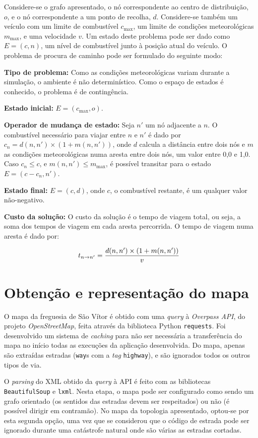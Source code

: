 \documentclass[12pt, a4paper, titlepage]{article}
\begin{document}
Considere-se o grafo apresentado, o nó correspondente ao centro de distribuição, $o$, e o nó
correspondente a um ponto de recolha, $d$. Considere-se também um veículo com um limite de
combustível $c_\text{max}$, um limite de condições meteorológicas $m_\text{max}$, e uma velocidade
$v$. Um estado deste problema pode ser dado como $E = (c, n)$, um nível de combustível junto à
posição atual do veículo. O problema de procura de caminho pode ser formulado do seguinte modo:

\textbf{Tipo de problema:} Como as condições meteorológicas variam durante a simulação, o ambiente é
não determinístico. Como o espaço de estados é conhecido, o problema é de contingência.

\textbf{Estado inicial:} $E = (c_\text{max}, o)$.

\textbf{Operador de mudança de estado:} Seja $n'$ um nó adjacente a $n$. O combustível necessário
para viajar entre $n$ e $n'$ é dado por $c_n = d(n, n') \times (1 + m(n, n'))$, onde $d$ calcula a
distância entre dois nós e $m$ as condições meteorológicas numa aresta entre dois nós, um valor
entre 0,0 e 1,0. Caso $c_n \le c$, e $m(n, n') \le m_\text{max}$, é possível transitar para o estado
$E = (c - c_n, n')$.

\textbf{Estado final:} $E = (c, d)$, onde $c$, o combustível restante, é um qualquer valor
não-negativo.

\textbf{Custo da solução:} O custo da solução é o tempo de viagem total, ou seja, a soma dos tempos
de viagem em cada aresta percorrida. O tempo de viagem numa aresta é dado por:

$$t_{n \rightarrow n'} = {d(n, n') \times (1 + m(n, n')) \over v}$$

\section{Obtenção e representação do mapa}

O mapa da freguesia de São Vítor é obtido com uma \emph{query} à \emph{Overpass API}, do projeto
\emph{OpenStreetMap}, feita através da biblioteca Python \texttt{requests}. Foi desenvolvido um
sistema de \emph{caching} para não ser necessária a transferência do mapa no início todas as
execuções da aplicação desenvolvida. Do mapa, apenas são extraídas estradas (\texttt{way}s com a
\emph{tag} \texttt{highway}), e são ignorados todos os outros tipos de via.

O \emph{parsing} do XML obtido da \emph{query} à API é feito com as bibliotecas
\texttt{BeautifulSoup} e \texttt{lxml}. Nesta etapa, o mapa pode ser configurado como sendo um grafo
orientado (os sentidos das estradas devem ser respeitados) ou não (é possível dirigir em contramão).
No mapa da topologia apresentado, optou-se por esta segunda opção, uma vez que se considerou que o
código de estrada pode ser ignorado durante uma catástrofe natural onde são várias as estradas
cortadas.
\end{document}
